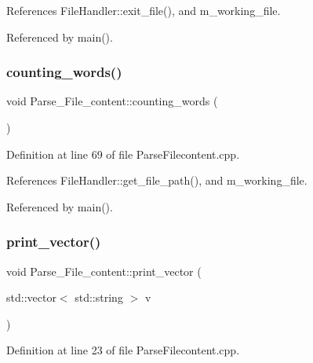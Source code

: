 References File\+Handler\+::exit\+\_\+file(), and m\+\_\+working\+\_\+file.



Referenced by main().

\mbox{\label{class_parse___file__content_ae3ba604aada833588554be25c5c9a607}} 
\subsubsection{\texorpdfstring{counting\+\_\+words()}{counting\_words()}}
{\footnotesize\ttfamily void Parse\+\_\+\+File\+\_\+content\+::counting\+\_\+words (\begin{DoxyParamCaption}{ }\end{DoxyParamCaption})}



Definition at line 69 of file Parse\+Filecontent.\+cpp.



References File\+Handler\+::get\+\_\+file\+\_\+path(), and m\+\_\+working\+\_\+file.



Referenced by main().

\mbox{\label{class_parse___file__content_aa535d5103a95ab10efa158088c228354}} 
\subsubsection{\texorpdfstring{print\+\_\+vector()}{print\_vector()}}
{\footnotesize\ttfamily void Parse\+\_\+\+File\+\_\+content\+::print\+\_\+vector (\begin{DoxyParamCaption}\item[{std\+::vector$<$ std\+::string $>$}]{v }\end{DoxyParamCaption})}



Definition at line 23 of file Parse\+Filecontent.\+cpp.



